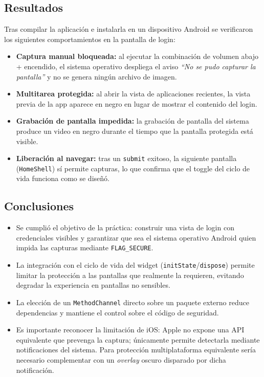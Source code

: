 \documentclass[12pt, a4paper]{article}
\begin{document}
\subsection{Resultados}
Tras compilar la aplicación e instalarla en un dispositivo Android se
verificaron los siguientes comportamientos en la pantalla de login:

\begin{itemize}
    \item \textbf{Captura manual bloqueada:} al ejecutar la combinación
    de volumen abajo + encendido, el sistema operativo despliega el aviso
    \textit{``No se pudo capturar la pantalla''} y no se genera ningún
    archivo de imagen.
    \item \textbf{Multitarea protegida:} al abrir la vista de aplicaciones
    recientes, la vista previa de la app aparece en negro en lugar de
    mostrar el contenido del login.
    \item \textbf{Grabación de pantalla impedida:} la grabación de pantalla
    del sistema produce un video en negro durante el tiempo que la
    pantalla protegida está visible.
    \item \textbf{Liberación al navegar:} tras un \texttt{submit} exitoso,
    la siguiente pantalla (\texttt{HomeShell}) sí permite capturas, lo
    que confirma que el toggle del ciclo de vida funciona como se
    diseñó.
\end{itemize}

\subsection{Conclusiones}
\begin{itemize}
    \item Se cumplió el objetivo de la práctica: construir una vista de
    login con credenciales visibles y garantizar que sea el sistema
    operativo Android quien impida las capturas mediante
    \texttt{FLAG\_SECURE}.
    \item La integración con el ciclo de vida del widget
    (\texttt{initState}/\texttt{dispose}) permite limitar la protección
    a las pantallas que realmente la requieren, evitando degradar la
    experiencia en pantallas no sensibles.
    \item La elección de un \texttt{MethodChannel} directo sobre un
    paquete externo reduce dependencias y mantiene el control sobre el
    código de seguridad.
    \item Es importante reconocer la limitación de iOS: Apple no expone
    una API equivalente que prevenga la captura; únicamente permite
    detectarla mediante notificaciones del sistema. Para protección
    multiplataforma equivalente sería necesario complementar con un
    \textit{overlay} oscuro disparado por dicha notificación.
\end{itemize}
\end{document}
